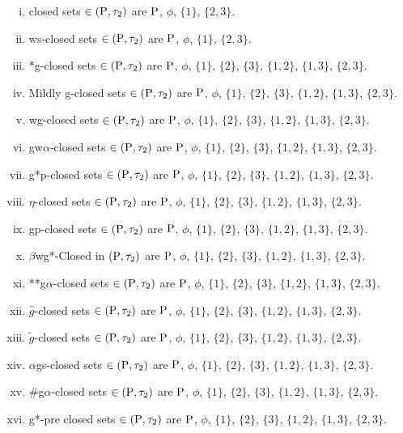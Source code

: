 \begin{exm}
\begin{enumerate}[(i)]
\item closed sets $\in(\mathrm{P}, \tau_{2})$ are $\mathrm{P}$, $\phi$, $\{1\}$, $\{2, 3\}$.
\item ws-closed sets $\in(\mathrm{P}, \tau_{2})$ are $\mathrm{P}$, $\phi$, $\{1\}$, $\{2, 3\}$.
\item *g-closed sets $\in(\mathrm{P}, \tau_{2})$ are $\mathrm{P}$, $\phi$, $\{1\}$, $\{2\}$, $\{3\}$, $\{1, 2\}$, $\{1, 3\}$, $\{2, 3\}$.
\item Mildly g-closed sets $\in(\mathrm{P}, \tau_{2})$ are $\mathrm{P}$, $\phi$, $\{1\}$, $\{2\}$, $\{3\}$, $\{1, 2\}$, $\{1, 3\}$, $\{2, 3\}$.
\item wg-closed sets $\in(\mathrm{P}, \tau_{2})$ are $\mathrm{P}$, $\phi$, $\{1\}$, $\{2\}$, $\{3\}$, $\{1, 2\}$, $\{1, 3\}$, $\{2, 3\}$.
\item gw$\alpha$-closed sets $\in(\mathrm{P}, \tau_{2})$ are $\mathrm{P}$, $\phi$, $\{1\}$, $\{2\}$, $\{3\}$, $\{1, 2\}$, $\{1, 3\}$, $\{2, 3\}$.
\item g*p-closed sets $\in(\mathrm{P}, \tau_{2})$ are $\mathrm{P}$, $\phi$, $\{1\}$, $\{2\}$, $\{3\}$, $\{1, 2\}$, $\{1, 3\}$, $\{2, 3\}$.
\item $\eta$-closed sets $\in(\mathrm{P}, \tau_{2})$ are $\mathrm{P}$, $\phi$, $\{1\}$, $\{2\}$, $\{3\}$, $\{1, 2\}$, $\{1, 3\}$, $\{2, 3\}$.
\item gp-closed sets $\in(\mathrm{P}, \tau_{2})$ are $\mathrm{P}$, $\phi$, $\{1\}$, $\{2\}$, $\{3\}$, $\{1, 2\}$, $\{1, 3\}$, $\{2, 3\}$.
\item $\beta$wg*-Closed in $(\mathrm{P}, \tau_{2})$ are $\mathrm{P}$, $\phi$, $\{1\}$, $\{2\}$, $\{3\}$, $\{1, 2\}$, $\{1, 3\}$, $\{2, 3\}$.
\item {*}{*}g$\alpha$-closed sets $\in(\mathrm{P}, \tau_{2})$ are $\mathrm{P}$, $\phi$, $\{1\}$, $\{2\}$, $\{3\}$, $\{1, 2\}$, $\{1, 3\}$, $\{2, 3\}$.
\item $\hat{g}$-closed sets $\in(\mathrm{P}, \tau_{2})$ are $\mathrm{P}$, $\phi$, $\{1\}$, $\{2\}$, $\{3\}$, $\{1, 2\}$, $\{1, 3\}$, $\{2, 3\}$.
\item $\tilde{g}$-closed sets $\in(\mathrm{P}, \tau_{2})$ are $\mathrm{P}$, $\phi$, $\{1\}$, $\{2\}$, $\{3\}$, $\{1, 2\}$, $\{1, 3\}$, $\{2, 3\}$.
\item $\alpha$gs-closed sets $\in(\mathrm{P}, \tau_{2})$ are $\mathrm{P}$, $\phi$, $\{1\}$, $\{2\}$, $\{3\}$, $\{1, 2\}$, $\{1, 3\}$, $\{2, 3\}$.
\item \#g$\alpha$-closed sets $\in(\mathrm{P}, \tau_{2})$ are $\mathrm{P}$, $\phi$, $\{1\}$, $\{2\}$, $\{3\}$, $\{1, 2\}$, $\{1, 3\}$, $\{2, 3\}$.
\item g*-pre closed sets $\in(\mathrm{P}, \tau_{2})$ are $\mathrm{P}$, $\phi$, $\{1\}$, $\{2\}$, $\{3\}$, $\{1, 2\}$, $\{1, 3\}$, $\{2, 3\}$.

\end{enumerate}
\end{exm}
